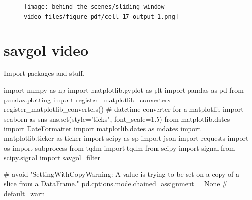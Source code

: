\documentclass[
  letterpaper,
  DIV=11,
  numbers=noendperiod,
  oneside]{scrreprt}
\newenvironment{Shaded}{\begin{snugshade}}{\end{snugshade}}
\newcommand{\BuiltInTok}[1]{\textcolor[rgb]{0.00,0.23,0.31}{#1}}
\newcommand{\CommentTok}[1]{\textcolor[rgb]{0.37,0.37,0.37}{#1}}
\newcommand{\FloatTok}[1]{\textcolor[rgb]{0.68,0.00,0.00}{#1}}
\newcommand{\ImportTok}[1]{\textcolor[rgb]{0.00,0.46,0.62}{#1}}
\newcommand{\NormalTok}[1]{\textcolor[rgb]{0.00,0.23,0.31}{#1}}
\newcommand{\OperatorTok}[1]{\textcolor[rgb]{0.37,0.37,0.37}{#1}}
\newcommand{\StringTok}[1]{\textcolor[rgb]{0.13,0.47,0.30}{#1}}
\newcommand{\VariableTok}[1]{\textcolor[rgb]{0.07,0.07,0.07}{#1}}
\begin{document}
\begin{figure}[H]

{\centering \texttt{[image: behind-the-scenes/sliding-window-video\_files/figure-pdf/cell-17-output-1.png]}

}

\end{figure}

\hypertarget{savgol-video}{%
\chapter*{savgol video}\label{savgol-video}}


Import packages and stuff.

\begin{Shaded}
\begin{Highlighting}[]
\ImportTok{import}\NormalTok{ numpy }\ImportTok{as}\NormalTok{ np}
\ImportTok{import}\NormalTok{ matplotlib.pyplot }\ImportTok{as}\NormalTok{ plt}
\ImportTok{import}\NormalTok{ pandas }\ImportTok{as}\NormalTok{ pd}
\ImportTok{from}\NormalTok{ pandas.plotting }\ImportTok{import}\NormalTok{ register\_matplotlib\_converters}
\NormalTok{register\_matplotlib\_converters()  }\CommentTok{\# datetime converter for a matplotlib}
\ImportTok{import}\NormalTok{ seaborn }\ImportTok{as}\NormalTok{ sns}
\NormalTok{sns.}\BuiltInTok{set}\NormalTok{(style}\OperatorTok{=}\StringTok{"ticks"}\NormalTok{, font\_scale}\OperatorTok{=}\FloatTok{1.5}\NormalTok{)}
\ImportTok{from}\NormalTok{ matplotlib.dates }\ImportTok{import}\NormalTok{ DateFormatter}
\ImportTok{import}\NormalTok{ matplotlib.dates }\ImportTok{as}\NormalTok{ mdates}
\ImportTok{import}\NormalTok{ matplotlib.ticker }\ImportTok{as}\NormalTok{ ticker}
\ImportTok{import}\NormalTok{ scipy }\ImportTok{as}\NormalTok{ sp}
\ImportTok{import}\NormalTok{ json}
\ImportTok{import}\NormalTok{ requests}
\ImportTok{import}\NormalTok{ os}
\ImportTok{import}\NormalTok{ subprocess}
\ImportTok{from}\NormalTok{ tqdm }\ImportTok{import}\NormalTok{ tqdm}
\ImportTok{from}\NormalTok{ scipy }\ImportTok{import}\NormalTok{ signal}
\ImportTok{from}\NormalTok{ scipy.signal }\ImportTok{import}\NormalTok{ savgol\_filter}


\CommentTok{\# avoid "SettingWithCopyWarning: A value is trying to be set on a copy of a slice from a DataFrame."}
\NormalTok{pd.options.mode.chained\_assignment }\OperatorTok{=} \VariableTok{None}  \CommentTok{\# default=\textquotesingle{}warn\textquotesingle{}}
\end{Highlighting}
\end{Shaded}
\end{document}
